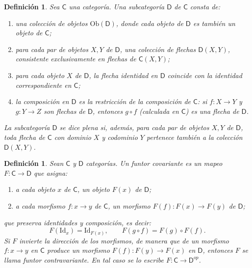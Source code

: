 \documentclass[12pt]{book}
\newtheorem{definition}[theorem]{Definición}
\newcommand{\Id}{\mathrm{Id}}
\begin{document}
\begin{definition}
Sea $\mathsf{C}$ una categoría.  
Una \emph{subcategoría} $\mathsf{D}$ de $\mathsf{C}$ consta de:

\begin{enumerate}[\normalfont (a)]
  \item una colección de objetos $\mathrm{Ob}(\mathsf{D})$, donde cada objeto de $\mathsf{D}$ es también un objeto de $\mathsf{C}$;

  \item para cada par de objetos $X,Y$ de $\mathsf{D}$, una colección de flechas
  $\mathsf{D}(X,Y)$, consistente exclusivamente en flechas de $\mathsf{C}(X,Y)$;

  \item para cada objeto $X$ de $\mathsf{D}$, la flecha identidad en $\mathsf{D}$ coincide con la identidad correspondiente en $\mathsf{C}$;

  \item la composición en $\mathsf{D}$ es la restricción de la composición de $\mathsf{C}$:
  si $f\colon X\to Y$ y $g\colon Y\to Z$ son flechas de $\mathsf{D}$, entonces 
  $g\circ f$ (calculada en $\mathsf{C}$) es una flecha de $\mathsf{D}$.
\end{enumerate}

La subcategoría $\mathsf{D}$ se dice \emph{plena} si, además, para cada par de objetos
$X,Y$ de $\mathsf{D}$, toda flecha de $\mathsf{C}$ con dominio $X$ y codominio $Y$
pertenece también a la colección $\mathsf{D}(X,Y)$.
\end{definition}



\begin{definition}\label{def: funtor}
Sean \( \mathsf{C} \) y \( \mathsf{D} \) categorías.
Un \emph{funtor covariante} es un mapeo \( F\colon\mathsf{C}\to\mathsf{D} \) que asigna:
\begin{enumerate}[\normalfont (1)]
  \item a cada objeto \( x \) de \( \mathsf{C} \), un objeto \( F(x) \) de \( \mathsf{D} \);
  \item a cada morfismo \( f\colon x\to y \) de \( \mathsf{C} \), un morfismo \( F(f)\colon F(x)\to F(y) \) de \( \mathsf{D} \);
\end{enumerate}
que preserva identidades y composición, es decir:
\[
F(\Id_{x})=\Id_{F(x)},
\qquad
F(g\circ f)=F(g)\circ F(f).
\]
Si \( F \) invierte la dirección de los morfismos, de manera que
de un morfismo \( f\colon x\to y \) en \( \mathsf{C} \)
produce un morfismo \( F(f)\colon F(y)\to F(x) \) en \( \mathsf{D} \),
entonces \( F \) se llama \emph{funtor contravariante}.
En tal caso se lo escribe \( F\colon \mathsf{C}\to\mathsf{D}^{op} \).
\end{definition}
\end{document}
